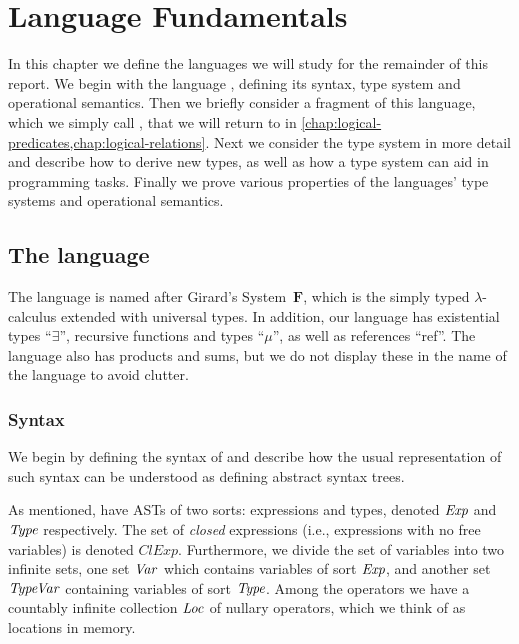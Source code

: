 \chapter[Language fundamentals][Language fundamentals]{Language Fundamentals}\label{chap:language-fundamentals}

In this chapter we define the languages we will study for the remainder of this report. We begin with the language \langrecref{}, defining its syntax, type system and operational semantics. Then we briefly consider a fragment of this language, which we simply call \langpure{}, that we will return to in \cref{chap:logical-predicates,chap:logical-relations}. Next we consider the type system in more detail and describe how to derive new types, as well as how a type system can aid in programming tasks. Finally we prove various properties of the languages' type systems and operational semantics.


\section{The language \texorpdfstring{\langrecref}{F\textunderscore exists,mu,ref}}

The language \langrecref{} is named after Girard's System~$\mathbf{F}$, which is the simply typed $\lambda$-calculus extended with universal types. In addition, our language has existential types \enquote{$\exists$}, recursive functions and types \enquote{$\mu$}, as well as references \enquote{ref}. The language also has products and sums, but we do not display these in the name of the language to avoid clutter.


\subsection{Syntax}

\newcommand{\setCExp}{\mathit{ClExp}}

We begin by defining the syntax of \langrecref{} and describe how the usual representation of such syntax can be understood as defining abstract syntax trees.

As mentioned, \langrecref{} have ASTs of two sorts: expressions and types, denoted $\mathit{Exp}$ and $\mathit{Type}$ respectively. The set of \emph{closed} expressions (i.e., expressions with no free variables) is denoted $\setCExp$\index[notation]{ClExp@$\setCExp$}. Furthermore, we divide the set of variables into two infinite sets, one set $\mathit{Var}$ which contains variables of sort $\mathit{Exp}$, and another set $\mathit{TypeVar}$ containing variables of sort $\mathit{Type}$. Among the operators we have a countably infinite collection $\mathit{Loc}$ of nullary operators, which we think of as locations in memory.

